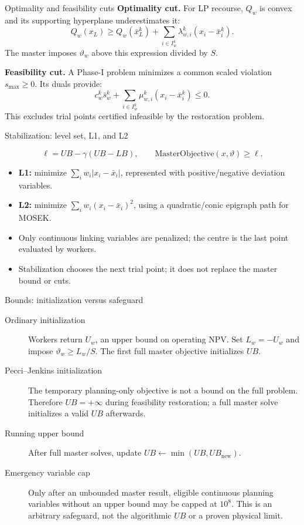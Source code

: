 \documentclass[aspectratio=169,10pt]{beamer}
\begin{document}
\begin{frame}{Optimality and feasibility cuts}
\small
\textbf{Optimality cut.} For LP recourse, $Q_w$ is convex and its supporting hyperplane underestimates it:
\[
Q_w(x_L)\geq Q_w(\bar{x}_L^k)+
\sum_{i\in I_w^k}\lambda_{w,i}^k(x_i-\bar{x}_i^k).
\]
The master imposes $\vartheta_w$ above this expression divided by $S$.

\vspace{2mm}
\textbf{Feasibility cut.} A Phase-I problem minimizes a common scaled violation $s_{\max}\geq0$. Its duals provide:
\[
c_w^k\bar{s}_w^k+
\sum_{i\in I_w^k}\mu_{w,i}^k(x_i-\bar{x}_i^k)\leq0.
\]
This excludes trial points certified infeasible by the restoration problem.
\end{frame}

\begin{frame}{Stabilization: level set, L1, and L2}

\[
\ell=UB-\gamma(UB-LB),\qquad
\mathrm{MasterObjective}(x,\vartheta)\geq\ell.
\]

\begin{itemize}
\setlength{\itemsep}{5mm}

\item \textbf{L1:} minimize $\sum_i w_i|x_i-\bar{x}_i|$, represented with positive/negative deviation variables.

\item \textbf{L2:} minimize $\sum_i w_i(x_i-\bar{x}_i)^2$, using a quadratic/conic epigraph path for MOSEK.

\item Only continuous linking variables are penalized; the centre is the last point evaluated by workers.

\item Stabilization chooses the next trial point; it does not replace the master bound or cuts.

\end{itemize}
\end{frame}

\begin{frame}{Bounds: initialization versus safeguard}
\small
\begin{description}
\item[Ordinary initialization] Workers return $U_w$, an upper bound on operating NPV. Set $L_w=-U_w$ and impose $\vartheta_w\geq L_w/S$. The first full master objective initializes $UB$.
\item[Pecci--Jenkins initialization] The temporary planning-only objective is not a bound on the full problem. Therefore $UB=+\infty$ during feasibility restoration; a full master solve initializes a valid $UB$ afterwards.
\item[Running upper bound] After full master solves, update $UB\leftarrow\min(UB,UB_{\mathrm{new}})$.
\item[Emergency variable cap] Only after an unbounded master result, eligible continuous planning variables without an upper bound may be capped at $10^8$. This is an arbitrary safeguard, not the algorithmic $UB$ or a proven physical limit.
\end{description}
\end{frame}
\end{document}

